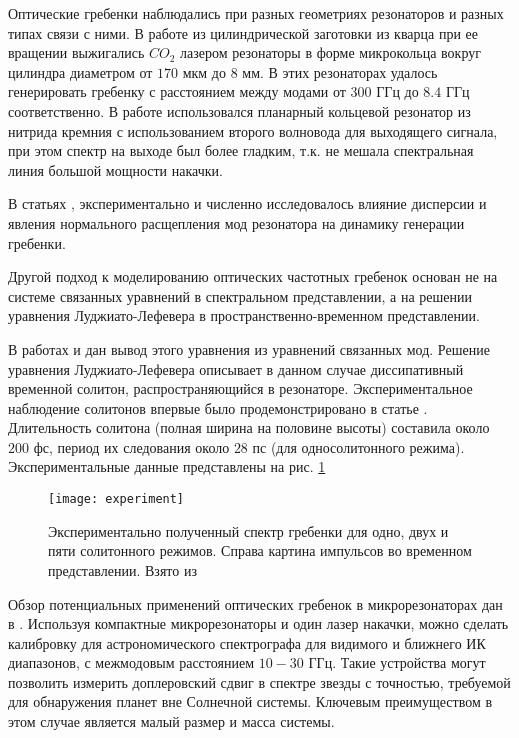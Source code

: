 Оптические гребенки наблюдались при разных геометриях резонаторов и разных типах связи с ними. В работе \cite{microrod_resonator} из цилиндрической заготовки из кварца при ее вращении выжигались $CO_2$ лазером резонаторы в форме микрокольца вокруг цилиндра диаметром от $170$ мкм до $8$ мм. В этих резонаторах удалось генерировать гребенку с расстоянием между модами от $300$ ГГц до $8.4$ ГГц соответственно. В работе \cite{dropport} использовался планарный кольцевой резонатор из нитрида кремния с использованием второго волновода для выходящего сигнала, при этом спектр на выходе был более гладким, т.к. не мешала спектральная линия большой мощности накачки.

В статьях \cite{mode_spectrum_MLG}, \cite{cavity_spectrum_Grudinin} экспериментально и численно исследовалось влияние дисперсии и явления нормального расщепления мод резонатора на динамику генерации гребенки.

Другой подход к моделированию оптических частотных гребенок основан не на системе связанных уравнений в спектральном представлении, а на решении уравнения Луджиато-Лефевера в пространственно-временном представлении.

В работах \cite{matsko_nls} и \cite{chembo_nls} дан вывод этого уравнения из уравнений связанных мод. Решение уравнения Луджиато-Лефевера описывает в данном случае диссипативный временной солитон, распространяющийся в резонаторе. Экспериментальное наблюдение солитонов впервые было продемонстрировано в статье \cite{mlg_to_nature}. Длительность солитона (полная ширина на половине высоты) составила около $200$ фс, период их следования около $28$ пс (для односолитонного режима). Экспериментальные данные представлены на рис. \ref{experiment}

\begin{figure}
  \texttt{[image: experiment]}
  \caption{Экспериментально полученный спектр гребенки для одно, двух и пяти солитонного режимов. Справа картина импульсов во временном представлении. Взято из \cite{mlg_to_nature}} \label{experiment}
\end{figure}

Обзор потенциальных применений оптических гребенок в микрорезонаторах дан в \cite{ScienceMag}. Используя компактные микрорезонаторы и один лазер накачки, можно сделать калибровку для астрономического спектрографа для видимого и ближнего ИК диапазонов, с межмодовым расстоянием $10-30$ ГГц. Такие устройства могут позволить измерить доплеровский сдвиг в спектре звезды с точностью, требуемой для обнаружения планет вне Солнечной системы. Ключевым преимуществом в этом случае является малый размер и масса системы.

